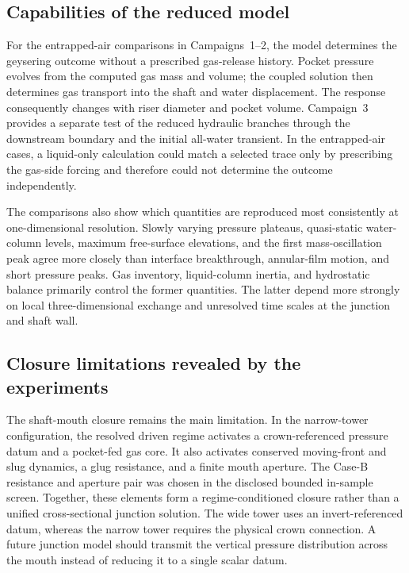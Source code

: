 \subsection{Capabilities of the reduced model}

For the entrapped-air comparisons in Campaigns~1--2, the model determines the
geysering outcome without a prescribed gas-release history. Pocket pressure
evolves from the computed gas mass and volume; the coupled solution then
determines gas transport into the shaft and water displacement. The response
consequently changes with riser diameter and pocket volume. Campaign~3 provides
a separate test of the reduced hydraulic branches through the downstream
boundary and the initial all-water transient. In the entrapped-air cases, a
liquid-only calculation could match a selected trace only by prescribing the
gas-side forcing and therefore could not determine the outcome independently.

The comparisons also show which quantities are reproduced most consistently at
one-dimensional resolution. Slowly varying pressure plateaus, quasi-static
water-column levels, maximum free-surface elevations, and the first
mass-oscillation peak agree more closely than interface breakthrough,
annular-film motion, and short pressure peaks. Gas inventory, liquid-column
inertia, and hydrostatic balance primarily control the former quantities. The
latter depend more strongly on local three-dimensional exchange and unresolved
time scales at the junction and shaft wall.

\subsection{Closure limitations revealed by the experiments}

The shaft-mouth closure remains the main limitation. In the narrow-tower
configuration, the resolved driven regime activates a crown-referenced
pressure datum and a pocket-fed gas core. It also activates conserved
moving-front and slug dynamics, a glug resistance, and a finite mouth aperture.
The Case-B resistance and aperture pair was chosen in the disclosed bounded
in-sample screen. Together, these
elements form a regime-conditioned closure rather than a unified
cross-sectional junction solution. The wide tower uses an invert-referenced
datum, whereas the narrow tower requires the physical crown connection. A
future junction model should transmit the vertical pressure distribution
across the mouth instead of reducing it to a single scalar datum.

